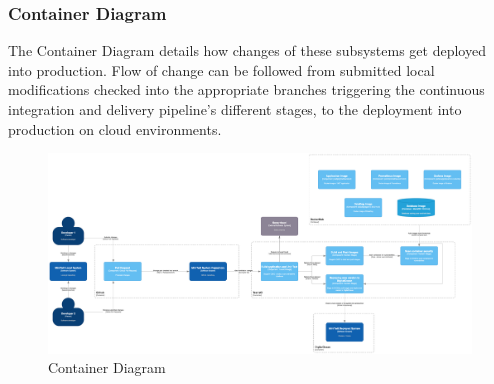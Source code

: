 \newpage
\subsubsection*{Container Diagram}

The Container Diagram details how changes of these subsystems get deployed into production. Flow of change can be followed from submitted local modifications checked into the appropriate branches triggering the continuous integration and delivery pipeline’s different stages, to the deployment into production on cloud environments.

\begin{figure}[h!]
    \centering
    \includegraphics[width=\linewidth,height=\textheight,keepaspectratio]{images/architectural_views/workflow_of_change.png}
    \caption{Container Diagram ~\cite{containerDiagram}}
    \label{fig:containerdiagram}
\end{figure}